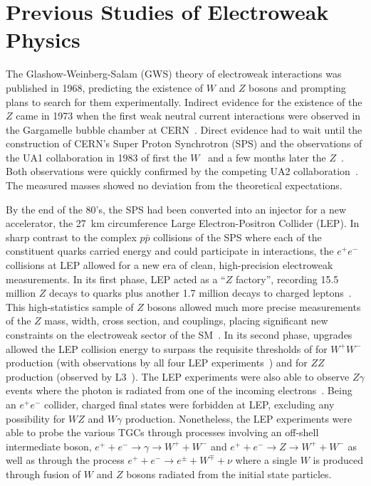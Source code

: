 \chapter{Previous Studies of Electroweak Physics}
\label{chap:previous}


The Glashow-Weinberg-Salam (GWS) theory of electroweak interactions was published in 1968, predicting the existence of $W$ and $Z$ bosons and prompting plans to search for them experimentally.  Indirect evidence for the existence of the $Z$ came in 1973 when the first weak neutral current interactions were observed in the Gargamelle bubble chamber at CERN~\cite{Hasert1973121}.  Direct evidence had to wait until the construction of CERN's Super Proton Synchrotron (SPS) and the observations of the UA1 collaboration in 1983 of first the $W$~\cite{Arnison1983103} and a few months later the $Z$~\cite{Arnison1983398}.  Both observations were quickly confirmed by the competing UA2 collaboration~\cite{Banner1983476,ISI:A1983QT60900027}. The measured masses showed no deviation from the theoretical expectations.

By the end of the 80's, the SPS had been converted into an injector for a new accelerator, the \SI{27}{km} circumference Large Electron-Positron Collider (LEP).  In sharp contrast to the complex $p\bar{p}$ collisions of the SPS where each of the constituent quarks carried energy and could participate in interactions, the $e^+e^-$ collisions at LEP allowed for a new era of clean, high-precision electroweak measurements.  In its first phase, LEP acted as a ``$Z$ factory'', recording 15.5 million $Z$ decays to quarks plus another 1.7 million decays to charged leptons~\cite{Drees:2001xw}.  This high-statistics sample of $Z$ bosons allowed much more precise measurements of the $Z$ mass, width, cross section, and couplings, placing significant new constraints on the electroweak sector of the SM~\cite{:2005ema}.  In its second phase, upgrades allowed the LEP collision energy to surpass the requisite thresholds of  for $W^+W^-$ production (with observations by all four LEP experiments~\cite{Barate2000205,Abreu200089,Acciarri200019,Abbiendi2000249}) and  for $ZZ$ production (observed by L3~\cite{Acciarri1999281}).  The LEP experiments were also able to observe $Z\gamma$ events where the photon is radiated from one of the incoming electrons~\cite{Barate:1999tg,Acciarri:2000yu}.  Being an $e^+e^-$ collider, charged final states were forbidden at LEP, excluding any possibility for $WZ$ and $W\gamma$ production.  Nonetheless, the LEP experiments were able to probe the various TGCs through processes involving an off-shell intermediate boson, $e^+ + e^- \to \gamma \to W^+ + W^-$ and $e^+ + e^- \to Z \to W^+ + W^-$ as well as through the process $e^+ + e^- \to e^\pm + W^\mp + \nu$ where a single $W$ is produced through fusion of $W$ and $Z$ bosons radiated from the initial state particles.

